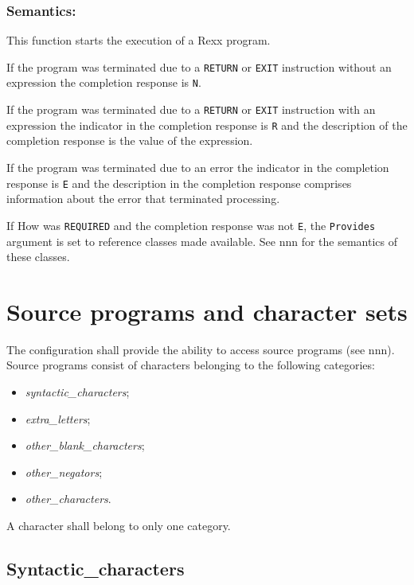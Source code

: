 \subsubsection{Semantics:}\label{semantics}

This function starts the execution of a Rexx program.

If the program was terminated due to a \texttt{RETURN} or \texttt{EXIT}
instruction without an expression the completion response is
\texttt{\textquotesingle{}N\textquotesingle{}}.

If the program was terminated due to a \texttt{RETURN} or \texttt{EXIT}
instruction with an expression the indicator in the completion response
is \texttt{\textquotesingle{}R\textquotesingle{}} and the description of
the completion response is the value of the expression.

If the program was terminated due to an error the indicator in the
completion response is \texttt{\textquotesingle{}E\textquotesingle{}}
and the description in the completion response comprises information
about the error that terminated processing.

If How was \texttt{\textquotesingle{}REQUIRED\textquotesingle{}} and the
completion response was not
\texttt{\textquotesingle{}E\textquotesingle{}}, the \texttt{Provides}
argument is set to reference classes made available. See nnn for the
semantics of these classes.

\section{Source programs and character
sets}\label{source-programs-and-character-sets}

The configuration shall provide the ability to access source programs
(see nnn). Source programs consist of characters belonging to the
following categories:

\begin{itemize}
\tightlist
\item
  \emph{syntactic\_characters};
\item
  \emph{extra\_letters};
\item
  \emph{other\_blank\_characters};
\item
  \emph{other\_negators};
\item
  \emph{other\_characters}.
\end{itemize}

A character shall belong to only one category.

\subsection{Syntactic\_characters}\label{syntactic_characters}

